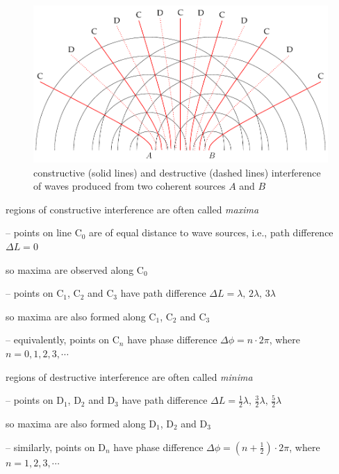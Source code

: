 \begin{figure}[htp]
	\centering
	\includegraphics[width=1\textwidth]{interference.pdf}
\caption{constructive (solid lines) and destructive (dashed lines) interference of waves produced from two coherent sources $A$ and $B$}
\end{figure}

\cmt regions of constructive interference are often called \emph{maxima}

\begin{compactitem}
	\item[--] points on line C$_0$ are of equal distance to wave sources, i.e., path difference $\Delta L = 0$
	
	so maxima are observed along C$_0$
	
	\item[--] points on C$_1$, C$_2$ and C$_3$ have path difference $\Delta L = \lambda, \, 2\lambda, \, 3\lambda$
	
	so maxima are also formed along C$_1$, C$_2$ and C$_3$
	
	\item[--] equivalently, points on C$_n$ have phase difference $\Delta \phi = n\cdot 2\pi$, where $n=0,1,2,3,\cdots$
\end{compactitem} 

\cmt regions of destructive interference are often called \emph{minima}

\begin{compactitem}
	\item[--] points on D$_1$, D$_2$ and D$_3$ have path difference $\Delta L = \frac{1}{2}\lambda, \, \frac{3}{2}\lambda, \, \frac{5}{2}\lambda$
	
	so maxima are also formed along D$_1$, D$_2$ and D$_3$
	
	\item[--] similarly, points on D$_n$ have phase difference $\Delta \phi = \left( n+\frac{1}{2} \right) \cdot 2\pi$, where $n=1,2,3,\cdots$
\end{compactitem} 






